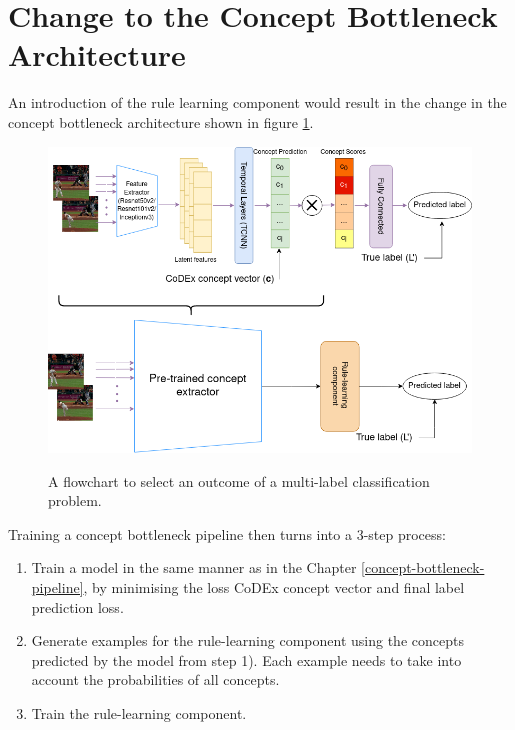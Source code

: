 \section{Change to the Concept Bottleneck Architecture}
\label{change-to-the-concept-bottleneck-architecture}

An introduction of the rule learning component would result in the change in the concept bottleneck architecture shown in figure \ref{logic-based-concept-bottleneck}.
\begin{figure}[h]
\caption{A flowchart to select an outcome of a multi-label classification problem.}
\vspace{10pt}
\centering
\includegraphics[width=\textwidth]{logic-based-classification/logic-based-classification-architecture.png}
\label{logic-based-concept-bottleneck}
\end{figure}

Training a concept bottleneck pipeline then turns into a 3-step process:
\begin{enumerate}
    \item Train a model in the same manner as in the Chapter \ref{concept-bottleneck-pipeline}, by minimising the loss CoDEx concept vector and final label prediction loss.
    \item Generate examples for the rule-learning component using the concepts predicted by the model from step 1). Each example needs to take into account the probabilities of all concepts.
    \item Train the rule-learning component.
\end{enumerate}

